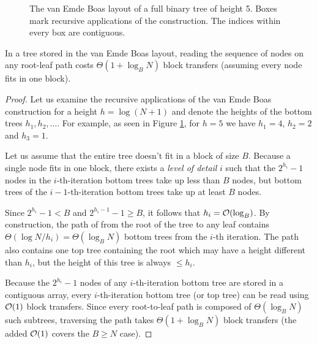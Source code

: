 \begin{figure}

\caption{The van Emde Boas layout of a full binary tree of height 5.
Boxes mark recursive applications of the construction. The indices within
every box are contiguous.}
\label{fig:veb_layout_5}
\end{figure}

\begin{theorem}
In a tree stored in the van Emde Boas layout, reading the sequence of nodes
on any root-leaf path costs $\Theta(1+\log_B N)$ block transfers (assuming
every node fits in one block).
\end{theorem}

\begin{proof}
Let us examine the recursive applications of the van Emde Boas construction
for a height $h=\log (N+1)$ and denote the heights of the bottom trees
$h_1, h_2, \ldots$. For example, as seen in Figure \ref{fig:veb_layout_5}, for
$h=5$ we have $h_1=4$, $h_2=2$ and $h_3=1$.

Let us assume that the entire tree doesn't fit in a block of size $B$.
Because a single node fits in one block, there exists a \textit{level of
detail} $i$ such that the $2^{h_i}-1$ nodes in the $i$-th-iteration bottom trees
take up less than $B$ nodes, but bottom trees of the $i-1$-th-iteration bottom
trees take up at least $B$ nodes.

Since $2^{h_i}-1 < B$ and $2^{h_i-1}-1 \geq B$, it follows that $h_i=\mathcal{O}(\log_B)$.
By construction, the path of from the root of the tree to any leaf contains
$\Theta(\log N/h_i)=\Theta(\log_B N)$ bottom trees from the $i$-th iteration.
The path also contains one top tree containing the root which may have a height
different than $h_i$, but the height of this tree is always $\leq h_i$.

Because the $2^{h_i}-1$ nodes of any $i$-th-iteration bottom tree are stored
in a contiguous array, every $i$-th-iteration bottom tree (or top tree)
can be read using $\mathcal{O}(1)$ block transfers. Since every root-to-leaf path
is composed of $\Theta(\log_B N)$ such subtrees, traversing the path
takes $\Theta(1+\log_B N)$ block transfers (the added $\mathcal{O}(1)$ covers
the $B\geq N$ case).
\end{proof}

